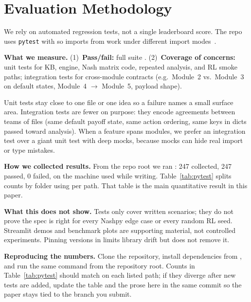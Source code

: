 \section{Evaluation Methodology}

We rely on automated regression tests, not a single leaderboard score. The repo uses \texttt{pytest} with  so imports from  work under different import modes~\cite{pytest}.

\textbf{What we measure.} (1)~\textbf{Pass/fail:} full suite . (2)~\textbf{Coverage of concerns:} unit tests for KB, engine, Nash matrix code, repeated analysis, and RL smoke paths; integration tests for cross-module contracts (e.g.\ Module~2 vs.\ Module~3 on default states, Module~4 $\rightarrow$ Module~5, payload shape).

Unit tests stay close to one file or one idea so a failure names a small surface area. Integration tests are fewer on purpose: they encode agreements between teams of files (same default payoff state, same action ordering, same keys in dicts passed toward analysis). When a feature spans modules, we prefer an integration test over a giant unit test with deep mocks, because mocks can hide real import or type mistakes.

\textbf{How we collected results.} From the repo root we ran : 247 collected, 247 passed, 0 failed, on the machine used while writing. Table~\ref{tab:pytest} splits counts by folder using  per path. That table is the main quantitative result in this paper.

\textbf{What this does not show.} Tests only cover written scenarios; they do not prove the spec is right for every Nashpy edge case or every random RL seed. Streamlit demos and benchmark plots are supporting material, not controlled experiments. Pinning versions in  limits library drift but does not remove it.

\textbf{Reproducing the numbers.} Clone the repository, install dependencies from , and run the same  command from the repository root. Counts in Table~\ref{tab:pytest} should match  on each listed path; if they diverge after new tests are added, update the table and the prose here in the same commit so the paper stays tied to the branch you submit.
